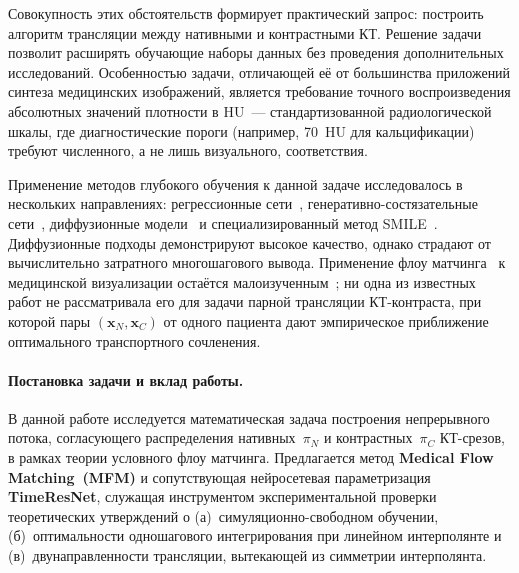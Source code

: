 Совокупность этих обстоятельств формирует практический запрос: построить алгоритм трансляции между нативными и контрастными КТ. Решение задачи позволит расширять обучающие наборы данных без проведения дополнительных исследований. Особенностью задачи, отличающей её от большинства приложений синтеза медицинских изображений, является требование точного воспроизведения абсолютных значений плотности в HU~--- стандартизованной радиологической шкалы, где диагностические пороги (например, 70~HU для кальцификации) требуют численного, а не лишь визуального, соответствия.

Применение методов глубокого обучения к данной задаче исследовалось в нескольких направлениях: регрессионные сети~\cite{article_dual}, генеративно-состязательные сети~\cite{hu2021bidirectional, article_nature}, диффузионные модели~\cite{article_nature, kim2024adaptive} и специализированный метод SMILE~\cite{liu2025see}. Диффузионные подходы демонстрируют высокое качество, однако страдают от вычислительно затратного многошагового вывода. Применение флоу матчинга~\cite{lipman2022flow, albergo2022building} к медицинской визуализации остаётся малоизученным~\cite{yazdani2025flow, reynaud2025echoflow}; ни одна из известных работ не рассматривала его для задачи парной трансляции КТ-контраста, при которой пары $(\mathbf{x}_N, \mathbf{x}_C)$ от одного пациента дают эмпирическое приближение оптимального транспортного сочленения.

\paragraph{Постановка задачи и вклад работы.}
В данной работе исследуется математическая задача построения непрерывного потока, согласующего распределения нативных~$\pi_N$ и контрастных~$\pi_C$ КТ-срезов, в рамках теории условного флоу матчинга. Предлагается метод \textbf{Medical Flow Matching~(MFM)} и сопутствующая нейросетевая параметризация \textbf{TimeResNet}, служащая инструментом экспериментальной проверки теоретических утверждений о (а)~симуляционно-свободном обучении, (б)~оптимальности одношагового интегрирования при линейном интерполянте и (в)~двунаправленности трансляции, вытекающей из симметрии интерполянта.

